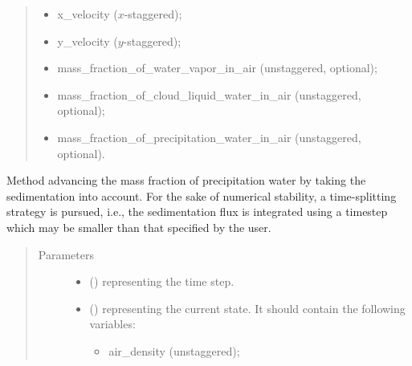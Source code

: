 \documentclass[letterpaper,10pt,english]{sphinxmanual}
\begin{document}
\begin{fulllineitems}
\begin{fulllineitems}
\begin{quote}
\begin{description}
\begin{itemize}
\begin{itemize}
\item {} 
x\_velocity (\(x\)-staggered);

\item {} 
y\_velocity (\(y\)-staggered);

\item {} 
mass\_fraction\_of\_water\_vapor\_in\_air (unstaggered, optional);

\item {} 
mass\_fraction\_of\_cloud\_liquid\_water\_in\_air (unstaggered, optional);

\item {} 
mass\_fraction\_of\_precipitation\_water\_in\_air (unstaggered, optional).

\end{itemize}


\end{itemize}

\end{description}\end{quote}

\end{fulllineitems}


\begin{fulllineitems}
\label{\detokenize{api:dycore.prognostic_isentropic_nonconservative_centered.PrognosticIsentropicNonconservativeCentered.step_integrating_sedimentation_flux}}
Method advancing the mass fraction of precipitation water by taking the sedimentation into account.
For the sake of numerical stability, a time-splitting strategy is pursued, i.e., the sedimentation flux
is integrated using a timestep which may be smaller than that specified by the user.
\begin{quote}\begin{description}
\item[{Parameters}] \leavevmode\begin{itemize}
\item {} 
 () \textendash{}  representing the time step.

\item {} 
 () \textendash{} 
 representing the current state.
It should contain the following variables:
\begin{itemize}
\item {} 
air\_density (unstaggered);


\end{itemize}
\end{itemize}
\end{description}
\end{quote}
\end{fulllineitems}
\end{fulllineitems}
\end{document}
